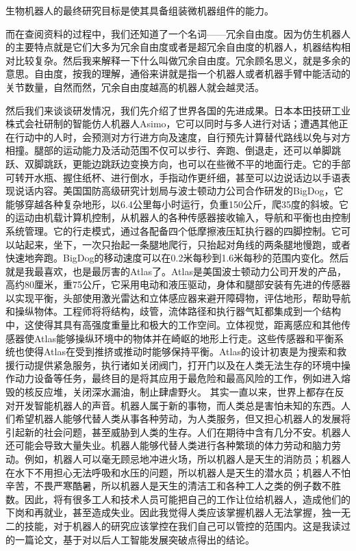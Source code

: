 \documentclass{article}
\begin{document}
\begin{itemize}
	生物机器人的最终研究目标是使其具备组装微机器组件的能力。\par
	而在查阅资料的过程中，我们还知道了一个名词——冗余自由度。因为仿生机器人的主要特点就是它们大多为冗余自由度或者是超冗余自由度的机器人，机器结构相对比较复杂。然后我来解释一下什么叫做冗余自由度。冗余顾名思义，就是多余的意思。自由度，按我的理解，通俗来讲就是指一个机器人或者机器手臂中能活动的关节数量，自然而然，冗余自由度越高的机器人就会越灵活。\par
	然后我们来谈谈研发情况，我们先介绍了世界各国的先进成果。日本本田技研工业株式会社研制的智能仿人机器人Asimo，它可以同时与多人进行对话；遭遇其他正在行动中的人时，会预测对方行进方向及速度，自行预先计算替代路线以免与对方相撞。腿部的运动能力及活动范围不仅可以步行、奔跑、倒退走，还可以单脚跳跃、双脚跳跃，更能边跳跃边变换方向，也可以在些微不平的地面行走。它的手部可转开水瓶、握住纸杯、进行倒水，手指动作更纤细，甚至可以边说话边以手语表现说话内容。美国国防高级研究计划局与波士顿动力公司合作研发的BigDog，它能够穿越各种复杂地形，以6.4公里每小时运行，负重150公斤，爬35度的斜坡。它的运动由机载计算机控制，从机器人的各种传感器接收输入，导航和平衡也由控制系统管理。它的行走模式，通过各配备四个低摩擦液压缸执行器的四脚控制。它可以站起来，坐下，一次只抬起一条腿地爬行，只抬起对角线的两条腿地慢跑，或者快速地奔跑。BigDog的移动速度可以在0.2米每秒到1.6米每秒的范围内变化。然后就是我最喜欢，也是最厉害的Atlas了。Atlas是美国波士顿动力公司开发的产品，高约80厘米，重75公斤，它采用电动和液压驱动，身体和腿部安装有先进的传感器以实现平衡，头部使用激光雷达和立体感应器来避开障碍物，评估地形，帮助导航和操纵物体。工程师将将结构，歧管，流体路径和执行器气缸都集成到一个结构中，这使得其具有高强度重量比和极大的工作空间。立体视觉，距离感应和其他传感器使Atlas能够操纵环境中的物体并在崎岖的地形上行走。这些传感器和平衡系统也使得Atlas在受到推挤或推动时能够保持平衡。Atlas的设计初衷是为搜索和救援行动提供紧急服务，执行诸如关闭阀门，打开门以及在人类无法生存的环境中操作动力设备等任务，最终目的是将其应用于最危险和最高风险的工作，例如进入熔毁的核反应堆，关闭深水漏油，制止肆虐野火。
	其实一直以来，世界上都存在反对开发智能机器人的声音。机器人属于新的事物，而人类总是害怕未知的东西。人们希望机器人能够代替人类从事各种劳动，为人类服务，但又担心机器人的发展将引起新的社会问题，甚至威胁到人类的生存。人们在期待中含有几分不安。机器人还可能会导致大量失业。机器人能够代替人类进行各种繁琐的体力劳动和脑力劳动。例如，机器人可以毫无顾忌地冲进火场，所以机器人是天生的消防员；机器人在水下不用担心无法呼吸和水压的问题，所以机器人是天生的潜水员；机器人不怕辛苦，不畏严寒酷暑，所以机器人是天生的清洁工和各种工人之类的例子数不胜数。因此，将有很多工人和技术人员可能把自己的工作让位给机器人，造成他们的下岗和再就业，甚至造成失业。因此我觉得人类应该掌握机器人无法掌握，独一无二的技能，对于机器人的研究应该掌控在我们自己可以管控的范围内。\citep{he4}这是我读过的一篇论文，基于对以后人工智能发展突破点得出的结论。

\end{itemize}
\end{document}
